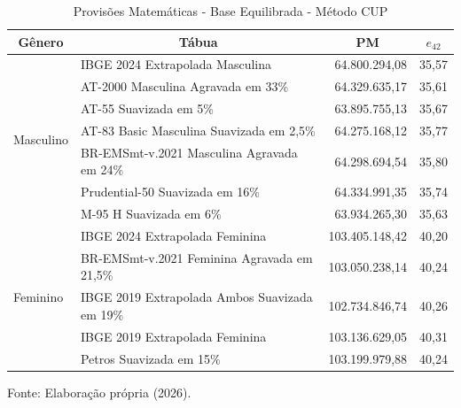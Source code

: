 \vspace{0.25cm}
\begin{table}[htbp]
    \centering
    \caption{Provisões Matemáticas - Base Equilibrada - Método CUP}
    \begin{threeparttable}
    \renewcommand{\arraystretch}{1.0}
    \begin{tabular}{llrr}
    \toprule
    \multicolumn{1}{c}{\textbf{Gênero}} & \multicolumn{1}{c}{\textbf{Tábua}} & \multicolumn{1}{c}{\textbf{PM}} & \multicolumn{1}{c}{\textbf{$e_{42}$}} \\ \midrule
    \multirow{7}{*}{Masculino} & IBGE 2024 Extrapolada Masculina & 64.800.294,08 & 35,57 \\
                                & AT-2000 Masculina Agravada em 33\% & 64.329.635,17 & 35,61 \\
                                & AT-55 Suavizada em 5\% & 63.895.755,13 & 35,67 \\
                                & AT-83 Basic Masculina Suavizada em 2,5\% & 64.275.168,12 & 35,77 \\
                                & BR-EMSmt-v.2021 Masculina Agravada em 24\% & 64.298.694,54 & 35,80 \\
                                & Prudential-50 Suavizada em 16\% & 64.334.991,35 & 35,74 \\
                                & M-95 H Suavizada em 6\% & 63.934.265,30 & 35,63 \\ \hline
    \multirow{5}{*}{Feminino} & IBGE 2024 Extrapolada Feminina & 103.405.148,42 & 40,20 \\
                                & BR-EMSmt-v.2021 Feminina Agravada em 21,5\% & 103.050.238,14 & 40,24\\
                                & IBGE 2019 Extrapolada Ambos Suavizada em 19\% & 102.734.846,74 & 40,26 \\
                                & IBGE 2019 Extrapolada Feminina & 103.136.629,05 & 40,31 \\
                                & Petros Suavizada em 15\% & 103.199.979,88 & 40,24 \\ \bottomrule
    \end{tabular}
    \begin{tablenotes}[flushleft]
        \small
        \item Fonte: Elaboração própria (2026).
    \end{tablenotes}
    \end{threeparttable}
    \label{tab:equilibrada-CUP}
\end{table}
